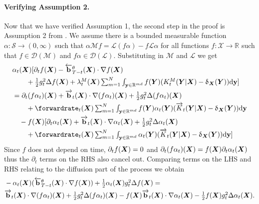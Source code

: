\paragraph{Verifying Assumption 2.} Now that we have verified Assumption 1, the
second step in the proof is Assumption 2 from \cite{benton2022denoising}. We
assume there is a bounded measurable function
$\alpha : \mathcal{S} \rightarrow (0, \infty)$ such that
$\alpha \mathcal{M} f = \mathcal{L}(f \alpha) - f \mathcal{L}\alpha$ for all
functions $f : \mathcal{X} \rightarrow \mathbb{R}$ such that
$f \in \mathcal{D}(\mathcal{M})$ and $f \alpha \in
\mathcal{D}(\mathcal{L})$. Substituting in $\mathcal{M}$ and $\mathcal{L}$ we
get
\begin{align}
  &\textstyle \alpha_t(\mX) [ \partial_t f(\mX) - \backwarddrift_{T-t}^\theta(\mX) \cdot \nabla f(\mX) \\
  & \qquad \textstyle + \frac{1}{2} g_{t}^2 \Delta f(\mX) + \mrate_t(\mX) \inty f(\mY) ( \mtk_t(\mY | \mX) - \updelta_{\mX}(\mY) ) \rmd \y ]\\
  &\textstyle = \partial_t( f \alpha_t) (\mX) + \forwarddrift_t(\mX) \cdot \nabla (f \alpha_t)(\mX) + \frac{1}{2} g_t^2 \Delta (f \alpha_t) (\mX)\\
  & \qquad \textstyle + \forwardrate_t(\mX) \inty f(\mY) \alpha_t(\mY) ( \ftk_t(\mY | \mX) - \updelta_{\mX}(\mY) ) \rmd \y\\
  &\textstyle  \quad - f(\mX) [ \partial_t \alpha_t(\mX) + \forwarddrift_t(\mX) \cdot \nabla \alpha_t(\mX) + \frac{1}{2} g_t^2 \Delta \alpha_t (\mX) \\
  & \qquad \textstyle + \forwardrate_t(\mX) \inty \alpha_t(\mY) ( \ftk_t(\mY | \mX) - \updelta_{\mX}(\mY) ) \rmd \y ] 
    \label{eq:assm2equality}
\end{align}
Since $f$ does not depend on time, $\partial_t f({\bm{X}}) = 0$ and $\partial_t(f \alpha_t) ({\bm{X}}) = f({\bm{X}}) \partial_t \alpha_t ({\bm{X}})$ thus the $\partial_t$ terms on the RHS also cancel out. Comparing terms on the LHS and RHS relating to the diffusion part of the process we obtain
\begin{align}
    &\textstyle - \alpha_t({\bm{X}}) ( \overleftarrow{\mathbf{b}}_{T-t}^\theta({\bm{X}}) \cdot \nabla f({\bm{X}})) + \frac{1}{2} \alpha_t({\bm{X}}) g_t^2 \Delta f({\bm{X}}) = \\
    &\textstyle \overrightarrow{\mathbf{b}}_t({\bm{X}}) \cdot \nabla(f \alpha_t) ({\bm{X}}) + \frac{1}{2} g_t^2 \Delta (f \alpha_t) ({\bm{X}}) - f({\bm{X}}) \overrightarrow{\mathbf{b}}_t({\bm{X}}) \cdot \nabla \alpha_t({\bm{X}}) - \frac{1}{2} f({\bm{X}}) g_t^2 \Delta \alpha_t({\bm{X}}) . 
\end{align}

